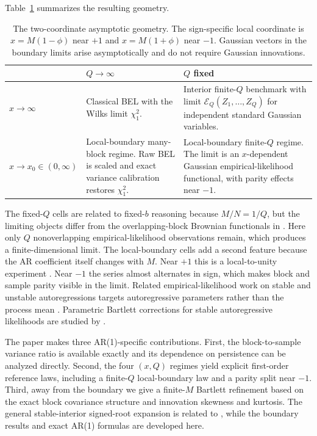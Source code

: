\documentclass[12pt]{article}
\theoremstyle{remark}
\begin{document}
Table~\ref{tab:four-regimes} summarizes the resulting geometry.
\begin{table}[htbp]
\centering
\caption{The two-coordinate asymptotic geometry. The sign-specific local coordinate is $x=M(1-\phi)$ near $+1$ and $x=M(1+\phi)$ near $-1$. Gaussian vectors in the boundary limits arise asymptotically and do not require Gaussian innovations.}
\label{tab:four-regimes}
\small
\begin{tabular}{p{}p{}p{}}
\toprule
 & $Q\to\infty$ & $Q$ fixed \\
\midrule
$x\to\infty$
& Classical BEL with the Wilks limit $\chi_1^2$.
& Interior finite-$Q$ benchmark with limit $\mathcal E_Q(Z_1,\ldots,Z_Q)$ for independent standard Gaussian variables. \\
\addlinespace
$x\to x_0\in(0,\infty)$
& Local-boundary many-block regime. Raw BEL is scaled and exact variance calibration restores $\chi_1^2$.
& Local-boundary finite-$Q$ regime. The limit is an $x$-dependent Gaussian empirical-likelihood functional, with parity effects near $-1$. \\
\bottomrule
\end{tabular}
\end{table}

The fixed-$Q$ cells are related to fixed-$b$ reasoning because $M/N=1/Q$, but the limiting objects differ from the overlapping-block Brownian functionals in \citet{Zhang.Shao:2014}. Here only $Q$ nonoverlapping empirical-likelihood observations remain, which produces a finite-dimensional limit. The local-boundary cells add a second feature because the AR coefficient itself changes with $M$. Near $+1$ this is a local-to-unity experiment \citep{Phillips:1987}. Near $-1$ the series almost alternates in sign, which makes block and sample parity visible in the limit. Related empirical-likelihood work on stable and unstable autoregressions targets autoregressive parameters rather than the process mean \citep{Chuang.Chan:2002}. Parametric Bartlett corrections for stable autoregressive likelihoods are studied by \citet{Giersbergen:2009,Giersbergen:2013}.

The paper makes three AR(1)-specific contributions. First, the block-to-sample variance ratio is available exactly and its dependence on persistence can be analyzed directly. Second, the four $(x,Q)$ regimes yield explicit first-order reference laws, including a finite-$Q$ local-boundary law and a parity split near $-1$. Third, away from the boundary we give a finite-$M$ Bartlett refinement based on the exact block covariance structure and innovation skewness and kurtosis. The general stable-interior signed-root expansion is related to \citet{Alksnis.Valeinis:2026}, while the boundary results and exact AR(1) formulas are developed here.
\end{document}
